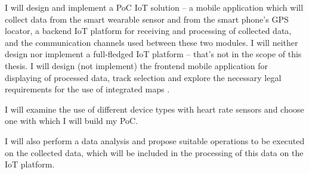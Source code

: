 I will design and implement a PoC IoT solution -- a mobile application which will collect data from the smart wearable sensor and from the smart phone's GPS locator, a backend IoT platform for receiving and processing of collected data, and the communication channels used between these two modules.
I will neither design nor implement a full-fledged IoT platform -- that's not in the scope of this thesis.
I will design (not implement) the frontend mobile application for displaying of processed data, track selection and explore the necessary legal requirements for the use of integrated maps .

I will examine the use of different device types with heart rate sensors and choose one with which I will build my PoC.

I will also perform a data analysis and propose suitable operations to be executed on the collected data, which will be included in the processing of this data on the IoT platform.
